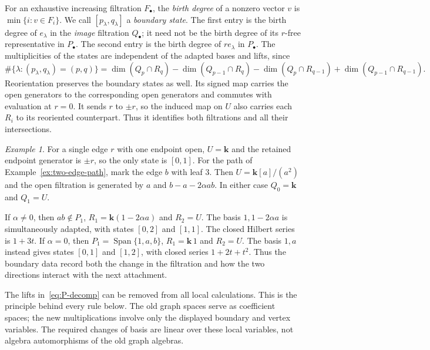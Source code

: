 \documentclass[reqno]{article}
\theoremstyle{plain} %
\theoremstyle{definition}
\theoremstyle{remark}
\newtheorem{example}[theorem]{\sc Example}
\DeclareMathOperator{\Span}{Span}
\newcommand{\K} {\mathbf{k}}
\numberwithin{equation}{section}
\begin{document}
For an exhaustive increasing filtration $F_\bullet$, the \emph{birth degree} of a
nonzero vector $v$ is $\min\{i:v\in F_i\}$. We call
$[p_\lambda,q_\lambda]$ a \emph{boundary state}. The first
entry is the birth degree of \(e_\lambda\) in the \emph{image}
filtration \(Q_\bullet\); it need not be the birth degree of its
\(r\)-free representative in \(P_\bullet\). The second entry is the
birth degree of \(re_\lambda\) in \(P_\bullet\). The multiplicities
of the states are independent of the adapted bases and lifts, since
\begin{equation}
\label{eq:state-multiplicity}
\#\{\lambda:(p_\lambda,q_\lambda)=(p,q)\}
=\dim(Q_p\cap R_q)-\dim(Q_{p-1}\cap R_q)
-\dim(Q_p\cap R_{q-1})+\dim(Q_{p-1}\cap R_{q-1}).
\end{equation}
Reorientation preserves the boundary states as well. Its signed map
carries the open generators to the corresponding open generators and
commutes with evaluation at $r=0$. It sends $r$ to $\pm r$, so the
induced map on $U$ also carries each $R_i$ to its reoriented counterpart.
Thus it identifies both filtrations and all their intersections.

\begin{example}\label{ex:path-states}
For a single edge $r$ with one endpoint open, $U=\K$ and the retained
endpoint generator is $\pm r$, so the only state is $[0,1]$.
For the path of Example~\ref{ex:two-edge-path}, mark the edge $b$ with
leaf $3$. Then $U=\K[a]/(a^2)$ and the open filtration is generated
by $a$ and $b-a-2\alpha ab$. In either case $Q_0=\K$ and $Q_1=U$.

If $\alpha\ne0$, then $ab\notin P_1$,
$R_1=\K(1-2\alpha a)$ and $R_2=U$. The basis
$1,1-2\alpha a$ is simultaneously adapted, with states $[0,2]$ and
$[1,1]$. The closed Hilbert series is $1+3t$.
If $\alpha=0$, then $P_1=\Span\{1,a,b\}$,
$R_1=\K\,1$ and $R_2=U$. The basis $1,a$ instead gives states
$[0,1]$ and $[1,2]$, with closed series $1+2t+t^2$.
Thus the boundary data record both the change in the filtration and
how the two directions interact with the next attachment.
\end{example}


The lifts in~\eqref{eq:P-decomp} can be removed from all local
calculations. This is the principle behind every rule below.
The old graph spaces serve as coefficient spaces; the new multiplications
involve only the displayed boundary and vertex variables. The required
changes of basis are linear over these local variables, not algebra
automorphisms of the old graph algebras.
\end{document}
